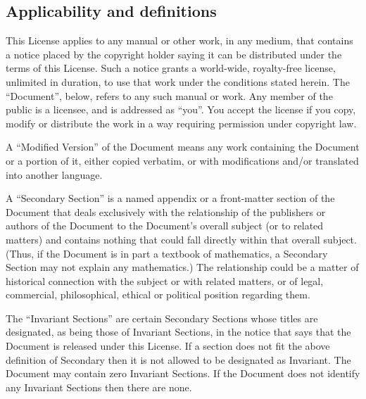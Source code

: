 \subsection{Applicability and definitions\label{subsec:1Applicability-and-definitions}}

{\tiny{}This License applies to any manual or other work, in any medium,
that contains a notice placed by the copyright holder saying it can
be distributed under the terms of this License. Such a notice grants
a world-wide, royalty-free license, unlimited in duration, to use
that work under the conditions stated herein. The \textquotedblleft Document\textsf{''},
below, refers to any such manual or work. Any member of the public
is a licensee, and is addressed as \textquotedblleft you\textsf{''}. You accept
the license if you copy, modify or distribute the work in a way requiring
permission under copyright law.}{\tiny\par}

{\tiny{}A \textquotedblleft Modified Version\textsf{''} of the Document means
any work containing the Document or a portion of it, either copied
verbatim, or with modifications and/or translated into another language.}{\tiny\par}

{\tiny{}A \textquotedblleft Secondary Section\textsf{''} is a named appendix
or a front-matter section of the Document that deals exclusively with
the relationship of the publishers or authors of the Document to the
Document\textsf{'}s overall subject (or to related matters) and contains nothing
that could fall directly within that overall subject. (Thus, if the
Document is in part a textbook of mathematics, a Secondary Section
may not explain any mathematics.) The relationship could be a matter
of historical connection with the subject or with related matters,
or of legal, commercial, philosophical, ethical or political position
regarding them.}{\tiny\par}

{\tiny{}The \textquotedblleft Invariant Sections\textsf{''} are certain Secondary
Sections whose titles are designated, as being those of Invariant
Sections, in the notice that says that the Document is released under
this License. If a section does not fit the above definition of Secondary
then it is not allowed to be designated as Invariant. The Document
may contain zero Invariant Sections. If the Document does not identify
any Invariant Sections then there are none.}{\tiny\par}

